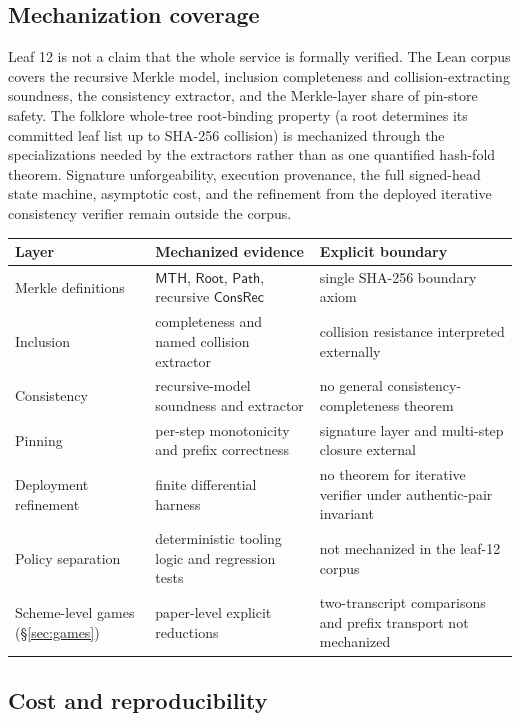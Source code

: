 \documentclass[11pt]{article}
\theoremstyle{remark}
\newcommand{\MTH}{\mathsf{MTH}}
\newcommand{\Root}{\mathsf{Root}}
\newcommand{\Path}{\mathsf{Path}}
\newcommand{\ConsRec}{\mathsf{ConsRec}}
\begin{document}
\subsection{Mechanization coverage}

Leaf 12 is not a claim that the whole service is formally verified. The Lean
corpus covers the recursive Merkle model, inclusion completeness and
collision-extracting soundness, the consistency extractor, and the Merkle-layer
share of pin-store safety. The folklore whole-tree root-binding property (a root determines its
committed leaf list up to SHA-256 collision) is
mechanized through the specializations needed by the extractors rather than as
one quantified hash-fold theorem. Signature unforgeability, execution
provenance, the full signed-head state machine, asymptotic cost, and the
refinement from the deployed iterative consistency verifier remain outside the
corpus.

\begin{center}\small
\begin{tabularx}{\textwidth}{@{}l>{\raggedright\arraybackslash}X>{\raggedright\arraybackslash}X@{}}
\toprule
Layer & Mechanized evidence & Explicit boundary \\
\midrule
Merkle definitions & $\MTH$, $\Root$, $\Path$, recursive $\ConsRec$ & single SHA-256 boundary axiom \\
Inclusion & completeness and named collision extractor & collision resistance interpreted externally \\
Consistency & recursive-model soundness and extractor & no general consistency-completeness theorem \\
Pinning & per-step monotonicity and prefix correctness & signature layer and multi-step closure external \\
Deployment refinement & finite differential harness & no theorem for iterative verifier under authentic-pair invariant \\
Policy separation & deterministic tooling logic and regression tests & not mechanized in the leaf-12 corpus \\
Scheme-level games (\S\ref{sec:games}) & paper-level explicit reductions & two-transcript comparisons and prefix transport not mechanized \\
\bottomrule
\end{tabularx}
\end{center}

\subsection{Cost and reproducibility}
\end{document}
